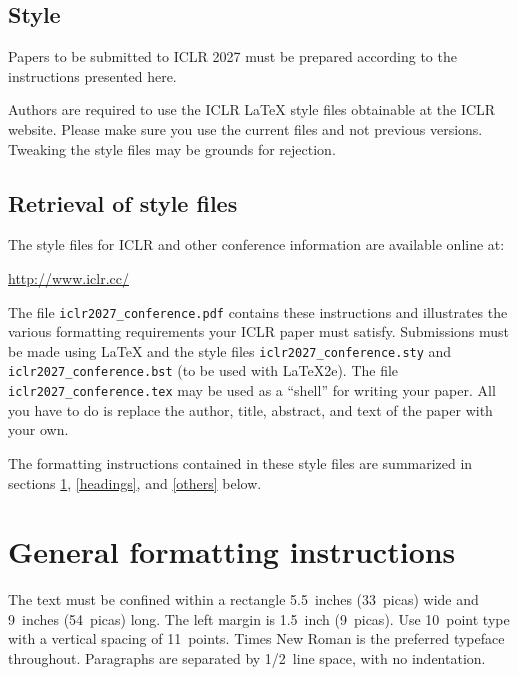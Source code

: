 \documentclass{article} %
\theoremstyle{plain}
\theoremstyle{definition}
\theoremstyle{remark}
\begin{document}
\subsection{Style}

Papers to be submitted to ICLR 2027 must be prepared according to the
instructions presented here.


Authors are required to use the ICLR \LaTeX{} style files obtainable at the
ICLR website. Please make sure you use the current files and
not previous versions. Tweaking the style files may be grounds for rejection.

\subsection{Retrieval of style files}

The style files for ICLR and other conference information are available online at:
\begin{center}
   \url{http://www.iclr.cc/}
\end{center}
The file \verb+iclr2027_conference.pdf+ contains these
instructions and illustrates the
various formatting requirements your ICLR paper must satisfy.
Submissions must be made using \LaTeX{} and the style files
\verb+iclr2027_conference.sty+ and \verb+iclr2027_conference.bst+ (to be used with \LaTeX{}2e). The file
\verb+iclr2027_conference.tex+ may be used as a ``shell'' for writing your paper. All you
have to do is replace the author, title, abstract, and text of the paper with
your own.

The formatting instructions contained in these style files are summarized in
sections \ref{gen_inst}, \ref{headings}, and \ref{others} below.

\section{General formatting instructions}
\label{gen_inst}

The text must be confined within a rectangle 5.5~inches (33~picas) wide and
9~inches (54~picas) long. The left margin is 1.5~inch (9~picas).
Use 10~point type with a vertical spacing of 11~points. Times New Roman is the
preferred typeface throughout. Paragraphs are separated by 1/2~line space,
with no indentation.
\end{document}
